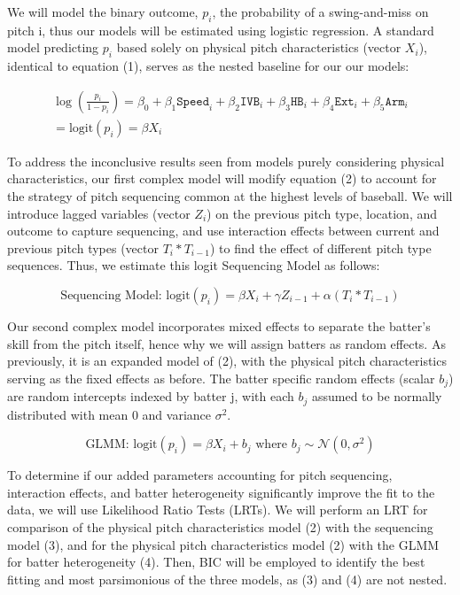 \documentclass[11pt]{article}
\begin{document}
We will model the binary outcome, $p_i$, the probability of a swing-and-miss on pitch i, thus our models will be estimated using logistic regression. 
A standard model predicting $p_i$ based solely on physical pitch characteristics (vector $X_i$), identical to equation (1), serves as the nested baseline for our our models:

\begin{equation} 
    \begin{gathered}  
    \log\left(\frac{p_i}{1 - p_i}\right)  
    = \beta_0 
    + \beta_1 \texttt{Speed}_i 
    + \beta_2 \texttt{IVB}_i 
    + \beta_3 \texttt{HB}_i 
    + \beta_4 \texttt{Ext}_i 
    + \beta_5 \texttt{Arm}_i \\ 
    = \text{logit}(p_i) = \beta X_i 
    \end{gathered} 
\end{equation}

To address the inconclusive results seen from models purely considering physical characteristics, our first complex model will modify equation (2) to account for the strategy of pitch sequencing common at the highest levels of baseball. 
We will introduce lagged variables (vector $Z_i$) on the previous pitch type, location, and outcome to capture sequencing, and use interaction effects between current and previous pitch types (vector $T_i * T_{i-1}$) to find the effect of different pitch type sequences. Thus, we estimate this logit Sequencing Model as follows:

\begin{equation}
    \text{Sequencing Model: logit}(p_i) = \beta X_i + \gamma Z_{i-1} + \alpha (T_i * T_{i-1})
\end{equation}

Our second complex model incorporates mixed effects to separate the batter's skill from the pitch itself, hence why we will assign batters as random effects. 
As previously, it is an expanded model of (2), with the physical pitch characteristics serving as the fixed effects as before. 
The batter specific random effects (scalar $b_j$) are random intercepts indexed by batter j, with each $b_j$ assumed to be normally distributed with mean 0 and variance $\sigma^2$.  
 
\begin{equation}
      \text{GLMM: logit}(p_i) = \beta X_i + b_j  \text{  where } b_j \sim \mathcal{N}(0, \sigma^2)
\end{equation}

To determine if our added parameters accounting for pitch sequencing, interaction effects, and batter heterogeneity significantly improve the fit to the data, we will use Likelihood Ratio Tests (LRTs). We will perform an LRT for comparison of the physical pitch characteristics model (2) with the sequencing model (3), and for the physical pitch characteristics model (2) with the GLMM for batter heterogeneity (4). Then, BIC will be employed to identify the best fitting and most parsimonious of the three models, as (3) and (4) are not nested.
\end{document}
